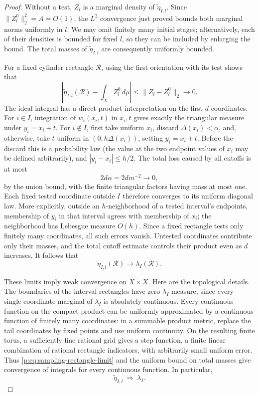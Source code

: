 \begin{proof}
Without a test, $Z_l$ is a marginal density of
$\widetilde\eta_{I,l}$.  Since $\|Z_l^0\|_2^2=A=O(1)$, the
$L^2$ convergence just proved bounds both marginal norms uniformly
in $l$.  We may omit finitely many initial stages; alternatively,
each of their densities is bounded for fixed $l$, so they can be
included by enlarging the bound.  The total masses of
$\widetilde\eta_{I,l}$ are consequently uniformly bounded.

For a fixed cylinder rectangle $\mathcal R$, using the first
orientation with its test shows that
\[
 \left|\widetilde\eta_{I,l}(\mathcal R)
       -\int_X Z_l^0\,d\mu\right|
 \le\|Z_l-Z_l^0\|_2\longrightarrow0.
\]
The ideal integral has a direct product interpretation on the first
$d$ coordinates.  For $i\in I$, integration of $w_i(x_i,t)$ in
$x_i,t$ gives exactly the triangular measure under $y_i=x_i+t$.
For $i\notin I$, first take uniform $x_i$, discard
$\Delta(x_i)<\alpha$, and, otherwise, take $t$ uniform in
$(0,h\Delta(x_i))$, setting $y_i=x_i+t$.  Before the discard this
is a probability law (the value at the two endpoint values of
$x_i$ may be defined arbitrarily), and
$|y_i-x_i|\le h/2$.  The total loss caused by all cutoffs is at most
\[
 2d\alpha=2dm^{-2}\longrightarrow0,
\]
by the union bound, with the finite triangular factors having mass
at most one.  Each fixed tested coordinate outside $I$ therefore
converges to its uniform diagonal law.  More explicitly, outside
an $h$-neighborhood of a tested interval's endpoints, membership
of $y_i$ in that interval agrees with membership of $x_i$; the
neighborhood has Lebesgue measure $O(h)$.  Since a fixed rectangle
tests only finitely many coordinates, all such errors vanish.
Untested coordinates contribute only their masses, and the total
cutoff estimate controls their product even as $d$ increases.
It follows that
\begin{equation}\label{p:eq:sampling-rectangle-limit}
 \widetilde\eta_{I,l}(\mathcal R)\longrightarrow
                  \lambda_I(\mathcal R).
\end{equation}

These limits imply weak convergence on $X\times X$.  Here are the
topological details.  The boundaries of the interval rectangles
have zero $\lambda_I$ measure, since every single-coordinate
marginal of $\lambda_I$ is absolutely continuous.  Every continuous
function on the compact product can be uniformly approximated by
a continuous function of finitely many coordinates: in a summable
product metric, replace the tail coordinates by fixed points and
use uniform continuity.  On the resulting finite torus, a sufficiently
fine rational grid gives a step function, a finite linear combination
of rational rectangle indicators, with arbitrarily small uniform
error.  Thus \eqref{p:eq:sampling-rectangle-limit} and the uniform
bound on total masses give convergence of integrals for every
continuous function.  In particular,
\[
 \widetilde\eta_{I,l}\ \Longrightarrow\ \lambda_I.
\]


\end{proof}

